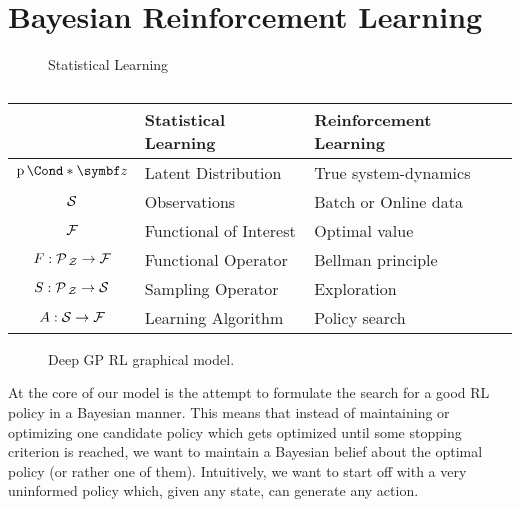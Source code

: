 \section{Bayesian Reinforcement Learning}
\label{toc:discussion:mountaincar}
\begin{figure}[tp]
    \centering
    \caption{
        Statistical Learning
        \label{fig:mountaincar:statistical_learning}
    }
\end{figure}
\begin{table}[tp]
    \caption{
        \label{tab:mountaincar:quantities_of_interest}
    }
    \centering
    \begin{tabularx}{.9\textwidth}{cYY}
        \toprule
                                  & Statistical Learning   & Reinforcement Learning \\
        \midrule
        $\Prob*{\mat{z}}$         & Latent Distribution    & True system-dynamics   \\
        $\mathcal{S}$                     & Observations           & Batch or Online data   \\
        $\mathcal{F}$                     & Functional of Interest & Optimal value          \\
        \midrule
        $F : \operatorname{\mathcal{P}\mkern2mu}_{\mathcal{Z}} \to \mathcal{F}$ & Functional Operator    & Bellman principle      \\
        $S : \operatorname{\mathcal{P}\mkern2mu}_{\mathcal{Z}} \to \mathcal{S}$ & Sampling Operator      & Exploration            \\
        $A : \mathcal{S} \to \mathcal{F}$         & Learning Algorithm     & Policy search          \\
        \bottomrule
    \end{tabularx}
\end{table}
\begin{figure}[tp]
    \centering
    
    \caption{
        \label{fig:mountaincar:graphical_model}
        Deep GP RL graphical model.
    }
\end{figure}
At the core of our model is the attempt to formulate the search for a good RL policy in a Bayesian manner.
This means that instead of maintaining or optimizing one candidate policy which gets optimized until some stopping criterion is reached, we want to maintain a Bayesian belief about the optimal policy (or rather one of them).
Intuitively, we want to start off with a very uninformed policy which, given any state, can generate any action.
